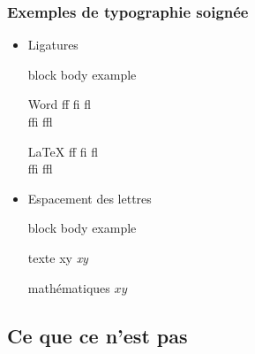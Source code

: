 \documentclass[aspectratio=54,10pt,xcolor=x11names]{beamer}
\renewenvironment{quote}{%
    \begin{beamercolorbox}[wd=\linewidth,sep=6pt]{block body example}}
    {\end{beamercolorbox}}
\theoremstyle{example}
\begin{document}
\begin{frame}
  \frametitle{Exemples de typographie soignée}
  \begin{itemize}
  \item Ligatures
    \begin{quote}
      \begin{minipage}{0.42\linewidth}
        \vspace{-12pt}
        \begin{block}{\small Word}
          \LARGE\rmfamily f\/f \quad f\/i \quad f\/l \\ f\/f\/i \quad
          f\/f\/l
        \end{block}
      \end{minipage}
      \hfill
      \begin{minipage}{0.42\linewidth}
        \vspace{-12pt}
        \begin{block}{\small \LaTeX}
          \LARGE\rmfamily ff \quad fi \quad fl \\ ffi \quad ffl
        \end{block}
      \end{minipage}
    \end{quote}
  \item Espacement des lettres
    \begin{quote}
      \begin{minipage}{0.45\linewidth}
        \vspace{-12pt}
        \begin{block}{\small texte}
          \LARGE\rmfamily xy \quad \emph{xy}
        \end{block}
      \end{minipage}
      \hfill
      \begin{minipage}{0.4\linewidth}
        \vspace{-12pt}
        \begin{block}{\small mathématiques}
          \LARGE $xy$
        \end{block}
      \end{minipage}
    \end{quote}
  \end{itemize}
\end{frame}

\subsection{Ce que ce n'est pas}
\end{document}
